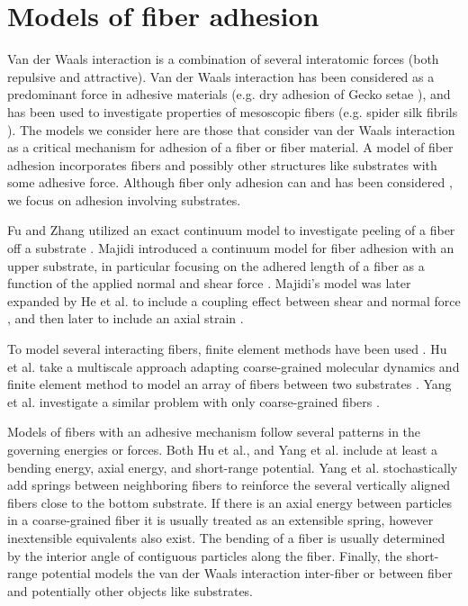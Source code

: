 \section{Models of fiber adhesion}

Van der Waals interaction is a combination of several interatomic forces (both repulsive and attractive).
Van der Waals interaction has been considered as a predominant force in adhesive materials (e.g. dry adhesion of Gecko setae \cite{Autumn2002}), and has been used to investigate properties of mesoscopic fibers (e.g. spider silk fibrils \cite{Cranford2013}).
The models we consider here are those that consider van der Waals interaction as a critical mechanism for adhesion of a fiber or fiber material.
A model of fiber adhesion incorporates fibers and possibly other structures like substrates with some adhesive force.
Although fiber only adhesion can and has been considered \cite{Li2011}, we focus on adhesion involving substrates. 
	
	Fu and Zhang utilized an exact continuum model to investigate peeling of a fiber off a substrate \cite{fu2011}. Majidi introduced a continuum model for fiber adhesion with an upper substrate, in particular focusing on the adhered length of a fiber as a function of the applied normal and shear force \cite{Majidi2009}. Majidi's model was later expanded by He et al. to include a coupling effect between shear and normal force \cite{He2012}, and then later to include an axial strain \cite{He2013}. 
	
	To model several interacting fibers, finite element methods have been used \cite{Radhakrishnan2013}. Hu et al. take a multiscale approach adapting coarse-grained molecular dynamics and finite element method to model an array of fibers between two substrates \cite{Hu2010}. Yang et al. investigate a similar problem with only coarse-grained fibers \cite{Yang2012}.
	
	Models of fibers with an adhesive mechanism follow several patterns in the governing energies or forces. Both Hu et al., and Yang et al. include at least a bending energy, axial energy, and short-range potential. Yang et al. stochastically add springs between neighboring fibers to reinforce the several vertically aligned fibers close to the bottom substrate. If there is an axial energy between particles in a coarse-grained fiber it is usually treated as an extensible spring, however inextensible equivalents also exist. The bending of a fiber is usually determined by the interior angle of contiguous particles along the fiber. Finally, the short-range potential models the van der Waals interaction inter-fiber or between fiber and potentially other objects like substrates. 

